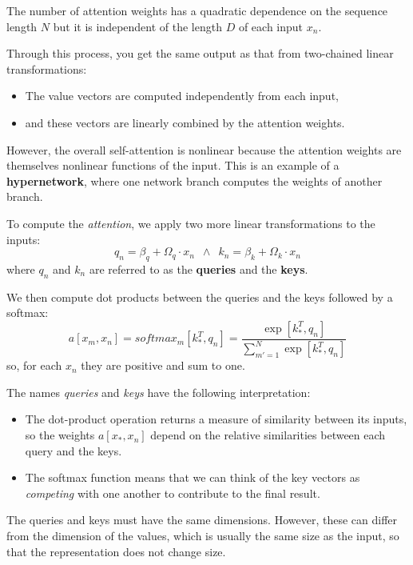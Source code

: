 The number of attention weights has a quadratic dependence on the sequence length $N$ but it is independent of the length
$D$ of each input $x_n$.

Through this process, you get the same output as that from two-chained linear transformations:
\begin{itemize}
    \item The value vectors are computed independently from each input, 
    \item and these vectors are linearly combined by the attention weights.
\end{itemize}

However, the overall self-attention is nonlinear because the attention weights are themselves nonlinear functions of the 
input. This is an example of a \textbf{hypernetwork}, where one network branch computes the weights of another branch.

To compute the \textit{attention}, we apply two more linear transformations to the inputs: 
\begin{equation}
    q_n = \beta_q + \Omega_q \cdot x_n \,\,\, \land \,\,\, k_n = \beta_k + \Omega_k \cdot x_n
\end{equation}
where $q_n$ and $k_n$ are referred to as the \textbf{queries} and the \textbf{keys}. 

We then compute dot products between the queries and the keys followed by a softmax: 
\begin{equation}
    a[x_m, x_n] = softmax_m [k_\ast^T, q_n] = \frac{\exp[k_\ast^T, q_n]}{\sum_{m' = 1}^N \exp[k_\ast^T, q_n]}
\end{equation}
so, for each $x_n$ they are positive and sum to one.

The names \textit{queries} and \textit{keys} have the following interpretation:
\begin{itemize}
    \item The dot-product operation returns a measure of similarity between its inputs, so the weights $a[x_\ast, x_n]$ 
        depend on the relative similarities between each query and the keys.
    \item The softmax function means that we can think of the key vectors as \textit{competing} with one another to 
        contribute to the final result. 
\end{itemize}
The queries and keys must have the same dimensions. However, these can differ from the dimension of the values, which is 
usually the same size as the input, so that the representation does not change size.

